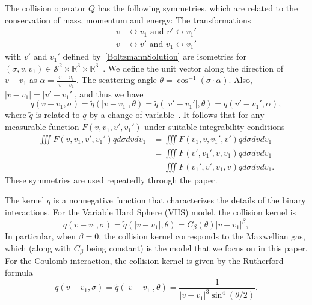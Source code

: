 \documentclass[times,final,nopreprintline]{elsarticle}
\newcommand{\bbR}{\mathbb R} \newcommand{\bbS}{\mathbb S}
\newcommand{\cS}{\mathcal S} \newcommand{\cT}{\mathcal T}
\begin{document}
The collision operator $Q$ has the following symmetries, which are related to the conservation of mass, momentum and energy: The transformations 
\begin{align*}
v &\leftrightarrow v_1  \mbox{ and } v' \leftrightarrow v_1'  \\
v &\leftrightarrow v'  \mbox{ and } v_1 \leftrightarrow v_1' 
\end{align*}
with $v'$ and $v_1'$ defined by~\eqref{BoltzmannSolution} are isometries for $(\sigma, v,v_1) \in \cS^2 \times \bbR^3 \times \bbR^3$~\cite{cercignani1969mathematical,villani2002review}. We define the unit vector along the direction of $v-v_1$ as $\alpha = \frac{v-v_1}{|v-v_1|}$. The scattering angle $\theta = \cos^{-1}{(\sigma\cdot \alpha)}$. Also, $|v-v_1|=|v'-v_1'|$, and thus we have
\begin{equation*}
q(v-v_1,\sigma) = \tilde q(|v-v_1|,\theta)=\tilde q(|v'-v_1'|, \theta) = q(v'-v_1',\alpha),
\end{equation*}
where $\tilde{q}$ is related to $q$ by a change of variable~\cite{villani2002review}.
It follows that for any measurable function $F(v,v_1,v',v_1')$ under suitable integrability conditions 
\begin{subequations}\label{eq:symmetry}
\begin{align}
\iiint F(v,v_1,v',v_1')q d\sigma dv dv_1 
&= \iiint F(v_1,v,v_1',v') q d\sigma dv dv_1 \\ %
 &= \iiint F(v',v_1',v,v_1) q d\sigma dv dv_1  \\ %
 &= \iiint F(v_1', v', v_1, v)q d\sigma dv dv_1. %
\end{align}
\end{subequations}
These symmetries are used repeatedly through the paper.


The kernel $q$ is a nonnegative function that characterizes the details of the binary interactions. 
For the Variable Hard Sphere (VHS) model, the collision kernel is
\begin{equation}
    q(v-v_1,\sigma) =  \tilde q(|v-v_1|,\theta) = C_\beta(\theta) |v-v_1|^\beta,
\end{equation}
In particular, when $\beta = 0$, the collision kernel corresponds to the Maxwellian gas, which (along with  $C_\beta$ being constant) is the model that we focus on in this paper. For the Coulomb interaction, the collision kernel is given by the Rutherford formula
$$
q(v-v_1,\sigma) = \tilde q(|v-v_1|,\theta) = \dfrac{1}{|v-v_1|^3\sin^4(\theta/2)}.
$$
\end{document}
